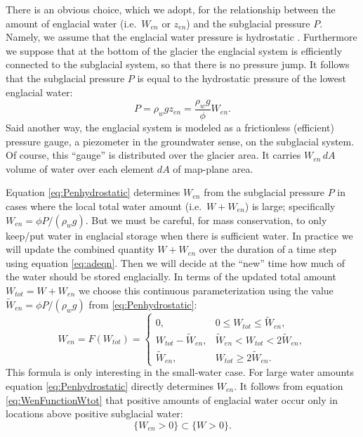 \documentclass[11pt,final]{amsart}
\begin{document}
There is an obvious choice, which we adopt, for the relationship between the amount of englacial water (i.e.~$W_{en}$ or $z_{en}$) and the subglacial pressure $P$.  Namely, we assume that the englacial water pressure is hydrostatic \citep[compare][]{Bartholomausetal2011}.  Furthermore we suppose that at the bottom of the glacier the englacial system is efficiently connected to the subglacial system, so that there is no pressure jump.  It follows that the subglacial pressure $P$ is equal to the hydrostatic pressure of the lowest englacial water:
\begin{equation}
P = \rho_w g z_{en} = \frac{\rho_w g}{\phi} W_{en}. \label{eq:Penhydrostatic}
\end{equation}
Said another way, the englacial system is modeled as a frictionless (efficient) pressure gauge, a piezometer in the groundwater sense, on the subglacial system.  Of course, this ``gauge'' is distributed over the glacier area.  It carries $W_{en}\, dA$ volume of water over each element $dA$ of map-plane area.

Equation \eqref{eq:Penhydrostatic} determines $W_{en}$ from the subglacial pressure $P$ in cases where the local total water amount (i.e.~$W+W_{en}$) is large; specifically $W_{en} = \phi P / (\rho_w g)$.  But we must be careful, for mass conservation, to only keep/put water in englacial storage when there is sufficient water.  In practice we will update the combined quantity $W+W_{en}$ over the duration of a time step using equation \eqref{eq:adeqn}.  Then we will decide at the ``new'' time how much of the water should be stored englacially.  In terms of the updated total amount $W_{tot}=W+W_{en}$ we choose this continuous parameterization using the value $\tilde W_{en} = \phi P / (\rho_w g)$ from \eqref{eq:Penhydrostatic}:
\begin{equation}
W_{en} = F(W_{tot}) = \begin{cases}
             0,                       & 0 \le W_{tot} \le \tilde W_{en}, \\
             W_{tot} - \tilde W_{en}, & \tilde W_{en} < W_{tot} < 2 \tilde W_{en}, \\
             \tilde W_{en},           & W_{tot} \ge 2 \tilde W_{en}. \end{cases}
    \label{eq:WenFunctionWtot}
\end{equation}
This formula is only interesting in the small-water case.  For large water amounts equation \eqref{eq:Penhydrostatic} directly determines $W_{en}$.  It follows from equation \eqref{eq:WenFunctionWtot} that positive amounts of englacial water occur only in locations above positive subglacial water:
      $$\{W_{en}>0\} \subset \{W>0\}.$$
\end{document}
